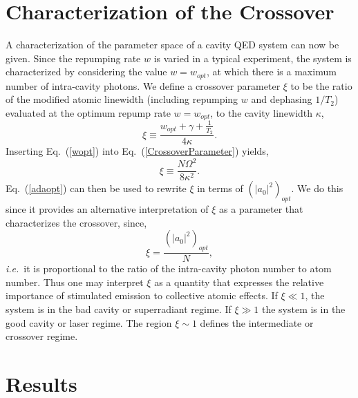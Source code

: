 \documentclass[aps,
twocolumn,
superscriptaddress,groupedaddress]{revtex4}
\begin{document}
\section{Characterization of the Crossover}
\label{sec:CrossoverCharacterization}

A characterization of the parameter space of a cavity QED system can
now be given. Since the repumping rate $w$ is varied in a typical
experiment, the system is characterized by considering the value
$w=w_{opt}$, at which there is a maximum number of intra-cavity
photons. We define a crossover parameter $\xi$ to be the ratio of the
modified atomic linewidth (including repumping $w$ and dephasing
$1/T_2$) evaluated at the optimum repump rate $w=w_{opt}$, to the
cavity linewidth $\kappa$,
\begin{equation}
\xi\equiv\frac{ w_{opt}+\gamma+\frac{1}{T_2}}{4\kappa}.
\label{CrossoverParameter}
\end{equation}
Inserting Eq.~(\ref{wopt}) into  Eq.~(\ref{CrossoverParameter}) yields,
\begin{equation}
\xi\equiv \frac{N \Omega^2}{8\kappa^2}.
\label{CrossoverParameter2}
\end{equation}
Eq.~(\ref{adaopt}) can then be used to rewrite $\xi$ in terms of
$(|a_0|^2)_{opt}$. We do this since it provides an alternative
interpretation of $\xi$ as a parameter that characterizes the
crossover, since,
\begin{equation}
\xi = \frac{(|a_0|^2)_{opt}}{N},
\end{equation}
{\em i.e.}\ it is proportional to the ratio of the intra-cavity photon
number to atom number. Thus one may interpret $\xi$ as a quantity that
expresses the relative importance of stimulated emission to collective
atomic effects. If $\xi\ll1$, the system is in the bad cavity or superradiant
regime. If $\xi\gg1$ the system is in the good cavity or laser
regime. The region $\xi\sim1$ defines the intermediate or crossover regime.


\section{Results}
\label{sec:Results}
\end{document}
